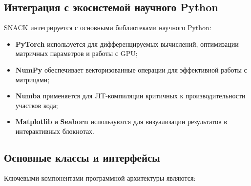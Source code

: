 \documentclass[12pt]{article}
\begin{document}
\subsection{Интеграция с экосистемой научного Python}

SNACK интегрируется с основными библиотеками научного Python:

\begin{itemize}
\item \textbf{PyTorch} используется для дифференцируемых вычислений, оптимизации матричных параметров и работы с GPU;
\item \textbf{NumPy} обеспечивает векторизованные операции для эффективной работы с матрицами;
\item \textbf{Numba} применяется для JIT-компиляции критичных к производительности участков кода;
\item \textbf{Matplotlib} и \textbf{Seaborn} используются для визуализации результатов в интерактивных блокнотах.
\end{itemize}

\subsection{Основные классы и интерфейсы}

Ключевыми компонентами программной архитектуры являются:
\end{document}
